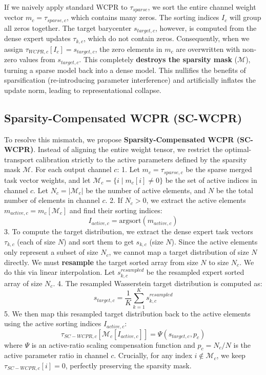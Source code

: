 \documentclass{article}
\theoremstyle{plain}
\theoremstyle{definition}
\theoremstyle{remark}
\begin{document}
If we naively apply standard WCPR to $\tau_{sparse}$, we sort the entire channel weight vector $m_c = \tau_{sparse, c}$, which contains many zeros. The sorting indices $I_c$ will group all zeros together. The target barycenter $s_{target, c}$, however, is computed from the dense expert updates $\tau_{k, c}$, which do not contain zeros.
Consequently, when we assign $\tau_{WCPR, c}[I_c] = s_{target, c}$, the zero elements in $m_c$ are overwritten with non-zero values from $s_{target, c}$. This completely \textbf{destroys the sparsity mask} ($\mathcal{M}$), turning a sparse model back into a dense model. This nullifies the benefits of sparsification (re-introducing parameter interference) and artificially inflates the update norm, leading to representational collapse.

\subsection{Sparsity-Compensated WCPR (SC-WCPR)}
To resolve this mismatch, we propose \textbf{Sparsity-Compensated WCPR (SC-WCPR)}. Instead of aligning the entire weight tensor, we restrict the optimal-transport calibration strictly to the active parameters defined by the sparsity mask $\mathcal{M}$.
For each output channel $c$:
1. Let $m_c = \tau_{sparse, c}$ be the sparse merged task vector weights, and let $\mathcal{M}_c = \{i \mid m_c[i] \neq 0\}$ be the set of active indices in channel $c$. Let $N_c = |\mathcal{M}_c|$ be the number of active elements, and $N$ be the total number of elements in channel $c$.
2. If $N_c > 0$, we extract the active elements $m_{active, c} = m_c[\mathcal{M}_c]$ and find their sorting indices:
\begin{equation}
    I_{active, c} = \text{argsort}(m_{active, c})
\end{equation}
3. To compute the target distribution, we extract the dense expert task vectors $\tau_{k, c}$ (each of size $N$) and sort them to get $s_{k, c}$ (size $N$). Since the active elements only represent a subset of size $N_c$, we cannot map a target distribution of size $N$ directly. We must \textbf{resample} the target sorted array from size $N$ to size $N_c$. We do this via linear interpolation. Let $s_{k, c}^{resampled}$ be the resampled expert sorted array of size $N_c$.
4. The resampled Wasserstein target distribution is computed as:
\begin{equation}
    s_{target, c} = \frac{1}{K}\sum_{k=1}^K s_{k, c}^{resampled}
\end{equation}
5. We then map this resampled target distribution back to the active elements using the active sorting indices $I_{active, c}$:
\begin{equation}
    \tau_{SC-WCPR, c}[\mathcal{M}_c[I_{active, c}]] = \Psi(s_{target, c}, p_c)
\end{equation}
where $\Psi$ is an active-ratio scaling compensation function and $p_c = N_c / N$ is the active parameter ratio in channel $c$. Crucially, for any index $i \notin \mathcal{M}_c$, we keep $\tau_{SC-WCPR, c}[i] = 0$, perfectly preserving the sparsity mask.
\end{document}
